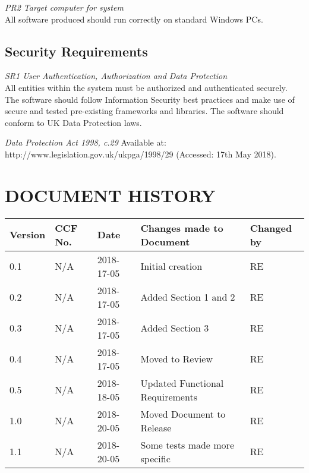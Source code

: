 \documentclass{project}
\begin{document}
\textit{PR2 Target computer for system}\\
All software produced should run correctly on standard Windows PCs.\\

\newpage

\subsection{Security Requirements}
\textit{SR1 User Authentication, Authorization and Data Protection}\\
All entities within the system must be authorized and authenticated securely. The software should follow Information Security best practices and make use of secure and tested pre-existing frameworks and libraries. The software should conform to UK Data Protection laws. \cite{dpa98}\\

\clearpage
{}
\begin{thebibliography}{5}
	 \emph{Data Protection Act 1998, c.29}
	Available at: http://www.legislation.gov.uk/ukpga/1998/29 (Accessed: 17th May 2018).
\end{thebibliography}

\clearpage
{}
\section*{DOCUMENT HISTORY}
\begin{tabular}{|l | l | l | l | l |}
	\hline
	Version & CCF No. & Date & Changes made to Document & Changed by \\
	\hline
	0.1 & N/A & 2018-17-05 & Initial creation & RE \\
	0.2 & N/A & 2018-17-05 & Added Section 1 and 2 & RE \\
	0.3 & N/A & 2018-17-05 & Added Section 3 & RE \\
	0.4 & N/A & 2018-17-05 & Moved to Review & RE \\
	0.5 & N/A & 2018-18-05 & Updated Functional Requirements & RE \\
	1.0 & N/A & 2018-20-05 & Moved Document to Release & RE \\
	1.1 & N/A & 2018-20-05 & Some tests made more specific & RE \\
	
	\hline
\end{tabular}
\label{thelastpage}
\end{document}
